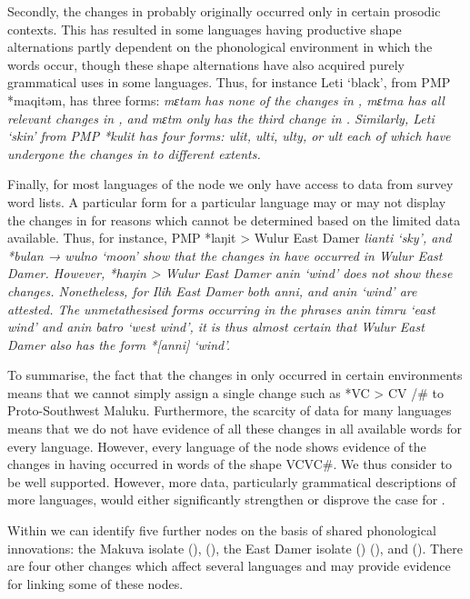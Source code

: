Secondly, the changes in  probably originally occurred only
in certain prosodic contexts.
This has resulted in some languages having productive shape alternations
partly dependent on the phonological environment in which the
words occur, though these shape alternations have also acquired purely grammatical
uses in some languages.
Thus, for instance Leti ‘black’,
from PMP *maqitəm, has three forms: \it{mɛtam} has none of the
changes in , \it{mɛtma} has all relevant changes in ,
and \it{mɛtm} only has the third change in .
Similarly, Leti ‘skin’ from PMP *kulit has four forms: \it{ulit,
ulti, ulty,} or \it{ult} each of which have undergone the changes
in  to different extents.

Finally, for most languages of the  node
we only have access to data from survey word lists.
A particular form for a particular language may or may not display
the changes in  for reasons which cannot be determined based
on the limited data available.
Thus, for instance, PMP *laŋit > Wulur East Damer \it{lianti}
‘sky’, and *bulan → \it{wulno} ‘moon’ show that the changes in 
have occurred in Wulur East Damer.
However, *haŋin > Wulur East Damer \it{anin} ‘wind’ does not show these changes.
Nonetheless, for Ilih East Damer both \it{anni,}
and \it{anin} ‘wind’ are attested.
The unmetathesised forms occurring
in the phrases \it{anin timru} ‘east wind’
and \it{anin batro} ‘west wind’,
it is thus almost certain that Wulur East Damer also has the form *[anni] ‘wind’.

To summarise, the fact that the changes in  only occurred
in certain environments means that we cannot simply assign a
single change such as *VC > CV /{\gap}{\#} to Proto-Southwest Maluku.
Furthermore, the scarcity of data for many languages means that
we do not have evidence of all these changes in all available
words for every language.
However, every language of the  node shows
evidence of the changes in  having occurred in words of the shape VCVC{\#}.
We thus consider  to be well supported.
However, more data, particularly grammatical descriptions of
more languages, would either significantly strengthen or disprove the case for .

Within  we can identify five further nodes
on the basis of shared phonological innovations: the Makuva isolate
(),  (), the East Damer isolate ()
 (), and  ().
There are four other changes which affect several  languages and may provide evidence for linking some of these nodes.

